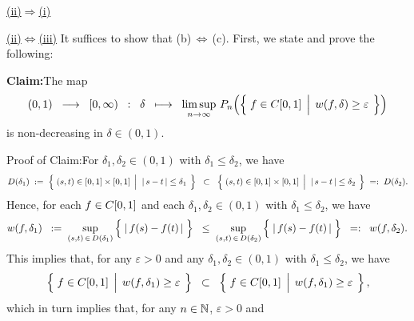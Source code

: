 \vskip 0.5cm
\noindent
\underline{(ii)\;$\Longrightarrow$\;(i)}\quad


\vskip 0.5cm
\noindent
\underline{(ii)\;$\Longleftrightarrow$\;(iii)}\quad
It suffices to show that (b)\,$\Longleftrightarrow$\,(c).
First, we state and prove the following:
\begin{center}
\begin{minipage}{6.0in}
\noindent
\textbf{Claim:}\quad The map
\begin{equation*}
(0,1) \;\; \longrightarrow \;\; [0,\infty)
\;\;:\;\;
\delta
\;\; \longmapsto \;\;
\limsup_{n\rightarrow\infty}\,
P_{n}\!\left(\left\{\;
	f \in \Czo
	\;\left\vert\;\,
	w(f,\delta) \overset{{\color{white}.}}{\geq} \varepsilon
	\right.
\;\right\}\right)
\end{equation*}
is non-decreasing in $\delta \in (0,1)$.
\end{minipage}
\end{center}
Proof of Claim:\quad For $\delta_{1}, \delta_{2} \in (0,1)$ with $\delta_{1} \leq \delta_{2}$, we have
\begin{equation*}
	D(\delta_{1})
	\; := \;
	\left\{\;
		(s,t) \in [0,1] \times [0,1]
		\;\left\vert\;\;
		\vert\,s - t\,\vert \overset{{\color{white}.}}{\leq} \delta_{1}
		\right.
	\;\right\}
	\;\;\subset\;\;
	\left\{\;
		(s,t) \in [0,1] \times [0,1]
		\;\left\vert\;\;
		\vert\,s - t\,\vert \overset{{\color{white}.}}{\leq} \delta_{2}
		\right.
	\;\right\}
	\; =: \;
	D(\delta_{2}).
\end{equation*}
Hence, for each $f \in C[0,1]$ and each $\delta_{1}, \delta_{2} \in (0,1)$ with $\delta_{1} \leq \delta_{2}$, we have
\begin{equation*}
w(f,\delta_{1})
\;\;:=\; \sup_{(s,t)\,\in\,D(\delta_{1})}\left\{\;\vert\,f(s)\overset{{\color{white}.}}{-}f(t)\,\vert\;\right\}
\;\;\leq\; \sup_{(s,t)\,\in\,D(\delta_{2})}\left\{\;\vert\,f(s)\overset{{\color{white}.}}{-}f(t)\,\vert\;\right\}
\;\; =: \;\; w(f,\delta_{2}).
\end{equation*}
This implies that, for any $\varepsilon > 0$ and
any $\delta_{1}, \delta_{2} \in (0,1)$ with $\delta_{1} \leq \delta_{2}$, we have
\begin{equation*}
\left\{\;
	f \in \Czo
	\;\left\vert\;\,
	w(f,\delta_{1}) \overset{{\color{white}.}}{\geq} \varepsilon
	\right.
\;\right\}
\;\;\subset\;\;
\left\{\;
	f \in \Czo
	\;\left\vert\;\,
	w(f,\delta_{1}) \overset{{\color{white}.}}{\geq} \varepsilon
	\right.
\;\right\},
\end{equation*}
which in turn implies that, for any $n \in \mathbb{N}$, $\varepsilon > 0$ and
